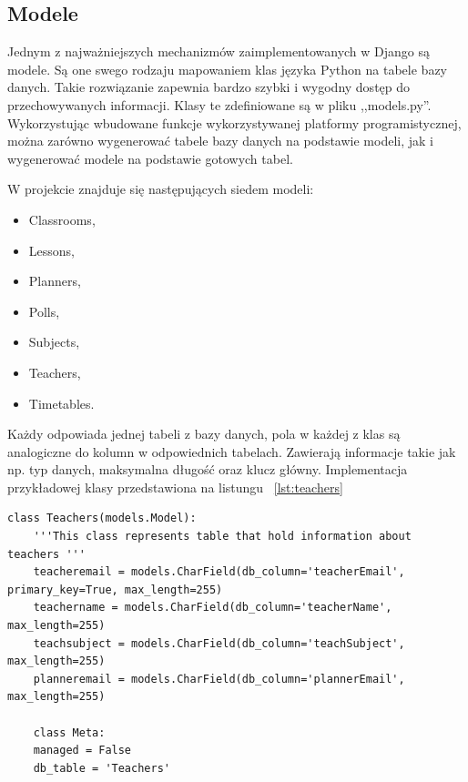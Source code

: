 \subsection{Modele}
Jednym z najważniejszych mechanizmów zaimplementowanych w Django są modele. Są one swego rodzaju mapowaniem klas języka Python na tabele bazy danych. Takie rozwiązanie zapewnia bardzo szybki i wygodny dostęp do przechowywanych informacji. Klasy te zdefiniowane są w pliku ,,models.py''. Wykorzystując wbudowane funkcje wykorzystywanej platformy programistycznej, można zarówno wygenerować tabele bazy danych na podstawie modeli, jak i wygenerować modele na podstawie gotowych tabel.

W projekcie znajduje się następujących siedem modeli: 
\begin{itemize}
	\item Classrooms,
	\item Lessons,
	\item Planners,
	\item Polls,
	\item Subjects,
	\item Teachers,
	\item Timetables.
\end{itemize}
Każdy odpowiada jednej tabeli z bazy danych, pola w każdej z klas są analogiczne do kolumn w odpowiednich tabelach. Zawierają informacje takie jak np. typ danych, maksymalna długość oraz klucz główny.
Implementacja przykładowej klasy przedstawiona na listungu ~\ref{lst:teachers}

\begin{lstlisting}[caption=Implementacja klasy Teachers, label={lst:teachers}]
	class Teachers(models.Model):
	'''This class represents table that hold information about teachers '''
	teacheremail = models.CharField(db_column='teacherEmail', primary_key=True, max_length=255)
	teachername = models.CharField(db_column='teacherName', max_length=255)
	teachsubject = models.CharField(db_column='teachSubject', max_length=255)
	planneremail = models.CharField(db_column='plannerEmail', max_length=255)
	
	class Meta:
	managed = False
	db_table = 'Teachers'
\end{lstlisting}


